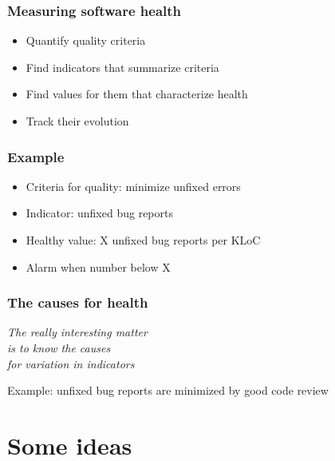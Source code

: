 \documentclass[17pt,aspectratio=169,hyperref=pdfusetitle]{beamer}
\begin{document}
\begin{frame}[fragile]
  \frametitle{Measuring software health}

  \begin{itemize}
  \item Quantify quality criteria
  \item Find indicators that summarize criteria
  \item Find values for them that characterize health
  \item Track their evolution
  \end{itemize}
\end{frame}

\begin{frame}[fragile]
  \frametitle{Example}

  \begin{itemize}
  \item Criteria for quality: minimize unfixed errors 
  \item Indicator: unfixed bug reports
  \item Healthy value: X unfixed bug reports per KLoC
  \item Alarm when number below X
  \end{itemize}
\end{frame}

\begin{frame}[fragile]
  \frametitle{The causes for health}

  {\em
  The really interesting matter \\
  is to know the causes \\
  for variation in indicators \\
  }
  \vspace{.5cm}
  
  Example: unfixed bug reports are minimized by good code review
  
\end{frame}


\section{Some ideas}
\end{document}
